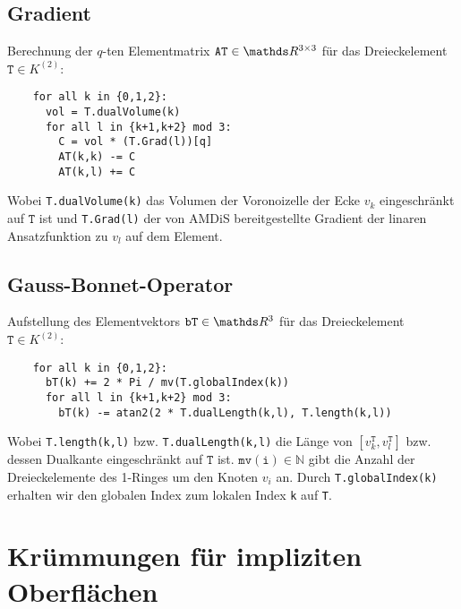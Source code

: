   \subsection{Gradient}
    \label{subsecAlgoGradient}
    Berechnung der \( q \)-ten Elementmatrix \( \mathtt{AT}\in\R^{3\times 3} \) für das Dreieckelement
    \( \mathtt{T}\in K^{(2)} \):
    \begin{verbatim}
    for all k in {0,1,2}:
      vol = T.dualVolume(k)
      for all l in {k+1,k+2} mod 3:
        C = vol * (T.Grad(l))[q]
        AT(k,k) -= C
        AT(k,l) += C
    \end{verbatim}
    Wobei \texttt{T.dualVolume(k)} das Volumen der Voronoizelle der Ecke \( v_{k} \) eingeschränkt auf \(
   \mathtt{T} \) ist und \texttt{T.Grad(l)} der von AMDiS bereitgestellte Gradient der linaren Ansatzfunktion zu \( v_{l} \)
   auf dem Element.

 \subsection{Gauss-Bonnet-Operator}
  \label{subsecAlgoGaussBonnet}
    Aufstellung des Elementvektors \( \mathtt{bT}\in\R^{3} \) für das Dreieckelement
    \( \mathtt{T}\in K^{(2)} \):
    \begin{verbatim}
    for all k in {0,1,2}:
      bT(k) += 2 * Pi / mv(T.globalIndex(k))
      for all l in {k+1,k+2} mod 3:
        bT(k) -= atan2(2 * T.dualLength(k,l), T.length(k,l))
    \end{verbatim}
    Wobei \texttt{T.length(k,l)} bzw. \texttt{T.dualLength(k,l)} die Länge von
    \( \left[ v^{\mathtt{T}}_{k} , v^{\mathtt{T}}_{l} \right] \) bzw. dessen Dualkante eingeschränkt auf \(
    \mathtt{T} \) ist. 
    \( \mathtt{mv(i)}\in\mathds{N} \) gibt die Anzahl der Dreieckelemente des 1-Ringes um den Knoten \( v_{i} \) an.
    Durch \texttt{T.globalIndex(k)} erhalten wir den globalen Index zum lokalen Index \texttt{k} auf \texttt{T}.

\section{Krümmungen für impliziten Oberflächen}

